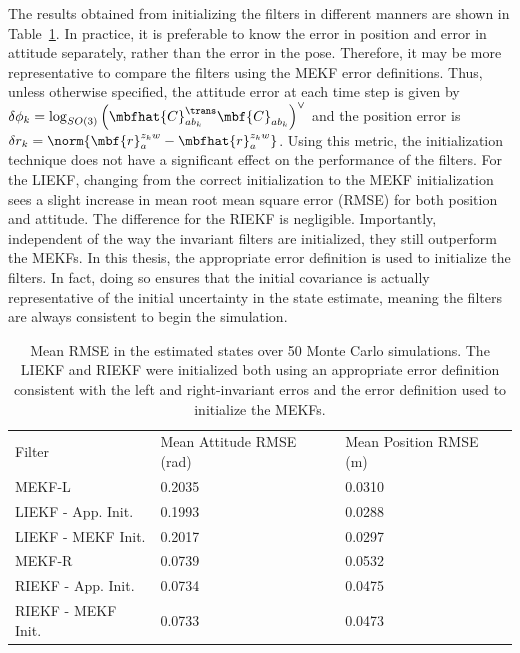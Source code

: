 \sloppy The results obtained from initializing the filters in different manners are shown in Table~\ref{tab:se3_mc_err}. In practice, it is preferable to know the error in position and error in attitude separately, rather than the error in the pose. Therefore, it may be more representative to compare the filters using the MEKF error definitions. Thus, unless otherwise specified, the attitude error at each time step is given by	$\delta \phi_k = \log_{SO(3)} \left(\mbfhat{C}_{ab_k}^\trans\mbf{C}_{ab_k} \right)^\vee$ and the position error is $\delta r_k = \norm{\mbf{r}_a^{z_kw} - \mbfhat{r}_a^{z_kw}}$. Using this metric, the initialization technique does not have a significant effect on the performance of the filters. For the LIEKF, changing from the correct initialization to the MEKF initialization sees a slight increase in mean root mean square error (RMSE) for both position and attitude. The difference for the RIEKF is negligible. Importantly, independent of the way the invariant filters are initialized, they still outperform the MEKFs. In this thesis, the appropriate error definition is used to initialize the filters. In fact, doing so ensures that the initial covariance is actually representative of the initial uncertainty in the state estimate, meaning the filters are always consistent to begin the simulation.
\begin{table}[]
\centering
\begin{tabular}{|l|l|l|}
\hline
Filter             & Mean Attitude RMSE (\si{rad}) & Mean Position RMSE (\si{m}) \\ \hhline{|=|=|=|}
MEKF-L             & 0.2035             & 0.0310             \\ \hline
LIEKF - App. Init. & 0.1993             & 0.0288             \\ \hline
LIEKF - MEKF Init. & 0.2017             & 0.0297             \\ \hline
MEKF-R             & 0.0739             & 0.0532             \\ \hline
RIEKF - App. Init. & 0.0734             & 0.0475             \\ \hline
RIEKF - MEKF Init. & 0.0733             & 0.0473             \\ \hline
\end{tabular}
\caption[Results comparing different Monte Carlo initialization methods.]{Mean RMSE in the estimated states over 50 Monte Carlo simulations. The LIEKF and RIEKF were initialized both using an appropriate error definition consistent with the left and right-invariant erros and the error definition used to initialize the MEKFs.}
\label{tab:se3_mc_err}
\end{table}

